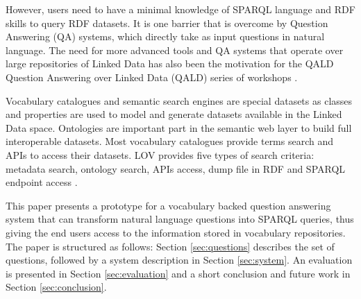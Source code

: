 \documentclass[runningheads,a4paper]{llncs}
\begin{document}
However, users need to have a minimal knowledge of SPARQL language and RDF skills to query  RDF datasets. It is one barrier that is overcome by Question Answering (QA) systems, which directly take as input questions in natural language. The need for more advanced tools and QA systems that operate over large repositories of Linked Data has also been the motivation for the QALD Question Answering over Linked Data (QALD) series of workshops \cite{lopezetal2013}. 
 
Vocabulary catalogues and semantic search engines are special datasets as classes and properties are used to model and generate datasets available in the Linked Data space. Ontologies are important part in the semantic web layer to build full interoperable datasets. Most vocabulary catalogues provide terms search and APIs to access their datasets. LOV provides five types of search criteria: metadata search, ontology search, APIs access, dump file in RDF and SPARQL endpoint access \cite{vandenbusschelov}.


 	 

This paper presents a prototype for a vocabulary backed question answering system that can transform natural language questions into SPARQL queries, thus giving the end users access to the information stored in vocabulary repositories. The paper is structured as follows: Section \ref{sec:questions} describes the set of questions, followed by a system description in Section \ref{sec:system}. An evaluation is presented in Section \ref{sec:evaluation} and a short conclusion and future work in Section \ref{sec:conclusion}.  
\end{document}

